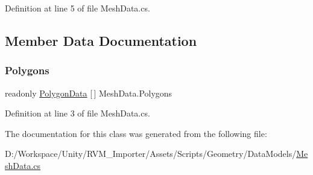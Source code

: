 Definition at line 5 of file Mesh\+Data.\+cs.



\subsection{Member Data Documentation}
\mbox{\label{class_mesh_data_a4c8bf9097af78b726829adfc21694da1}} 
\subsubsection{\texorpdfstring{Polygons}{Polygons}}
{\footnotesize\ttfamily readonly \mbox{\hyperlink{class_polygon_data}{Polygon\+Data}} \mbox{[}$\,$\mbox{]} Mesh\+Data.\+Polygons}



Definition at line 3 of file Mesh\+Data.\+cs.



The documentation for this class was generated from the following file\+:\begin{DoxyCompactItemize}
\item 
D\+:/\+Workspace/\+Unity/\+R\+V\+M\+\_\+\+Importer/\+Assets/\+Scripts/\+Geometry/\+Data\+Models/\mbox{\hyperlink{_mesh_data_8cs}{Mesh\+Data.\+cs}}\end{DoxyCompactItemize}
